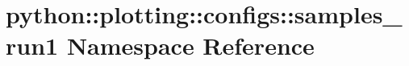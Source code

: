 \hypertarget{namespacepython_1_1plotting_1_1configs_1_1samples__run1}{
\section{python::plotting::configs::samples\_\-run1 Namespace Reference}
\label{namespacepython_1_1plotting_1_1configs_1_1samples__run1}
}

